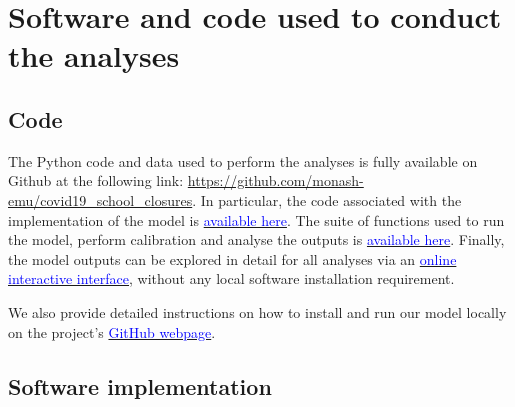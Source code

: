 \section{Software and code used to conduct the analyses}

\subsection{Code}
The Python code and data used to perform the analyses is fully available on Github at the following link:
\url{https://github.com/monash-emu/covid19_school_closures}. In particular, the code 
associated with the implementation of the model is \href{https://github.com/monash-emu/covid19_school_closures/blob/main/autumn/models/sm_covid2/model.py#L184-L549}{\textcolor{blue}{available here}}.
The suite of functions used to run the model, perform calibration and analyse the outputs is \href{https://github.com/monash-emu/covid19_school_closures/blob/main/autumn/projects/sm_covid2/common_school/runner_tools.py}{\textcolor{blue}{available here}}.
Finally, the model outputs can be explored in detail for all analyses via an \href{https://monash-emu.github.io/outputs/covid19-school-closures/}{\textcolor{blue}{online interactive interface}}, without
any local software installation requirement. 

We also provide detailed instructions on how to install and run our model locally on the project's \href{https://github.com/monash-emu/covid19_school_closures/blob/main/README.md}{\textcolor{blue}{GitHub webpage}}. 

\subsection{Software implementation}
